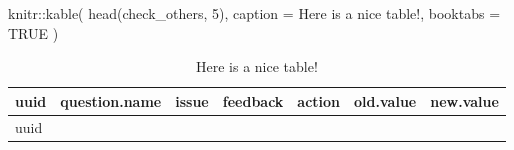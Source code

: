 \documentclass[
  letterpaper,
  DIV=11,
  numbers=noendperiod]{scrreprt}
\newenvironment{Shaded}{\begin{snugshade}}{\end{snugshade}}
\newcommand{\AttributeTok}[1]{\textcolor[rgb]{0.40,0.45,0.13}{#1}}
\newcommand{\ConstantTok}[1]{\textcolor[rgb]{0.56,0.35,0.01}{#1}}
\newcommand{\DecValTok}[1]{\textcolor[rgb]{0.68,0.00,0.00}{#1}}
\newcommand{\FunctionTok}[1]{\textcolor[rgb]{0.28,0.35,0.67}{#1}}
\newcommand{\NormalTok}[1]{\textcolor[rgb]{0.00,0.23,0.31}{#1}}
\newcommand{\SpecialCharTok}[1]{\textcolor[rgb]{0.37,0.37,0.37}{#1}}
\newcommand{\StringTok}[1]{\textcolor[rgb]{0.13,0.47,0.30}{#1}}
\begin{document}
\begin{Shaded}
\begin{Highlighting}[]
\NormalTok{knitr}\SpecialCharTok{::}\FunctionTok{kable}\NormalTok{(}
  \FunctionTok{head}\NormalTok{(check\_others, }\DecValTok{5}\NormalTok{), }\AttributeTok{caption =} \StringTok{\textquotesingle{}Here is a nice table!\textquotesingle{}}\NormalTok{,}
  \AttributeTok{booktabs =} \ConstantTok{TRUE}
\NormalTok{)}
\end{Highlighting}
\end{Shaded}

\begin{longtable}[]{@{}
  >{\raggedright\arraybackslash}p{}
  >{\raggedright\arraybackslash}p{}
  >{\raggedright\arraybackslash}p{}
  >{\raggedright\arraybackslash}p{}
  >{\raggedright\arraybackslash}p{}
  >{\raggedright\arraybackslash}p{}
  >{\raggedright\arraybackslash}p{}@{}}
\caption{Here is a nice table!}\tabularnewline
\toprule\noalign{}
\begin{minipage}[b]{\linewidth}\raggedright
uuid
\end{minipage} & \begin{minipage}[b]{\linewidth}\raggedright
question.name
\end{minipage} & \begin{minipage}[b]{\linewidth}\raggedright
issue
\end{minipage} & \begin{minipage}[b]{\linewidth}\raggedright
feedback
\end{minipage} & \begin{minipage}[b]{\linewidth}\raggedright
action
\end{minipage} & \begin{minipage}[b]{\linewidth}\raggedright
old.value
\end{minipage} & \begin{minipage}[b]{\linewidth}\raggedright
new.value
\end{minipage} \\
\midrule\noalign{}
\endfirsthead
\toprule\noalign{}
\begin{minipage}[b]{\linewidth}\raggedright
uuid
\end{minipage} & \begin{minipage}[b]{\linewidth}\raggedright

\end{minipage}
\end{longtable}
\end{document}
